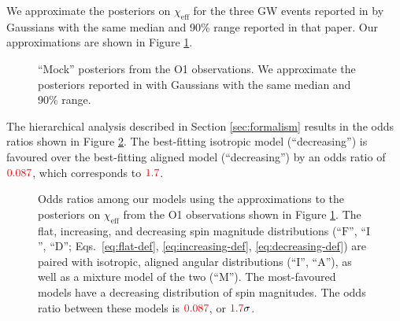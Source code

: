 \documentclass[modern]{aastex61}
\newcommand{\chieff}{\chi_\mathrm{eff}}
\newcommand{\checkme}[1]{\textcolor{red}{#1}}
\newcommand{\OOneSigmaIsoAligned}{\checkme{1.7}}
\newcommand{\OOneOddsIsoAligned}{\checkme{0.087}}
\begin{document}
We approximate the posteriors on $\chieff$ for the three \ac{GW}
events reported in \cite{O1-BBH} by Gaussians with the same median and
90\% range reported in that paper.  Our approximations are shown in
Figure \ref{fig:O1-posteriors}.

\begin{figure}
  \caption{\label{fig:O1-posteriors} ``Mock'' posteriors from the O1
    observations.  We approximate the posteriors reported in
    \citet{O1-BBH} with Gaussians with the same median and 90\%
    range.}
\end{figure}

The hierarchical analysis described in Section \ref{sec:formalism}
results in the odds ratios shown in Figure \ref{fig:O1-odds}.  The
best-fitting isotropic model (``decreasing'') is favoured over the
best-fitting aligned model (``decreasing'') by an odds ratio of
$\OOneOddsIsoAligned$, which corresponds to $\OOneSigmaIsoAligned$.


\begin{figure}
  \caption{Odds ratios among our models using the approximations
    to the posteriors on $\chieff$ from the O1 observations shown in
    Figure \ref{fig:O1-posteriors}.  The flat, increasing, and
    decreasing spin magnitude distributions (``$\mathrm{F}$'', ``$\mathrm{I}$'', ``$\mathrm{D}$'';
    Eqs.\ \eqref{eq:flat-def}, \eqref{eq:increasing-def},
    \eqref{eq:decreasing-def}) are paired with isotropic, aligned
    angular distributions (``$\mathrm{I}$'', ``$\mathrm{A}$''), as well as a mixture model of the two (``$\mathrm{M}$'').  The most-favoured models have a decreasing distribution of spin magnitudes.  The odds ratio between these
    models is $\OOneOddsIsoAligned$, or $\OOneSigmaIsoAligned\sigma$.}
  \label{fig:O1-odds}
\end{figure}
\end{document}

